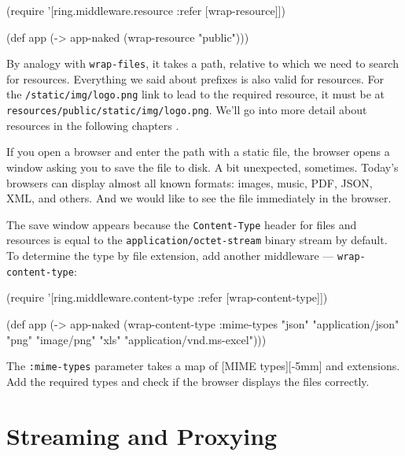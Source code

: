 
\begin{english}
\begin{clojure}
(require '[ring.middleware.resource
:refer [wrap-resource]])

(def app (-> app-naked
(wrap-resource "public")))
\end{clojure}
\end{english}

By analogy with \verb|wrap-files|, it takes a path, relative to which we need to search for resources. Everything we said about prefixes is also valid for resources. For the \verb|/static/img/logo.png| link to lead to the required resource, it must be at \verb|resources/public/static/img/logo.png|. We'll go into more detail about resources in the following chapters .

If you open a browser and enter the path with a static file, the browser opens a window asking you to save the file to disk. A bit unexpected, sometimes. Today's browsers can display almost all known formats:
images, music, PDF, JSON, XML, and others. And we would like to see the file immediately in the browser.

The save window appears because the \verb|Content-Type| header for files and resources is equal to the \verb|application/octet-stream| binary stream by default. To determine the type by file extension, add another middleware — \verb|wrap-content-type|:

\begin{english}
\begin{clojure}
(require '[ring.middleware.content-type
:refer [wrap-content-type]])

(def app
(-> app-naked
(wrap-content-type
{:mime-types
{"json" "application/json"
"png" "image/png"
"xls" "application/vnd.ms-excel"}})))
\end{clojure}
\end{english}

The \verb|:mime-types| parameter takes a map of [MIME types][-5mm] and extensions. Add the required types and check if the browser displays the files correctly.


\section{Streaming and Proxying}

